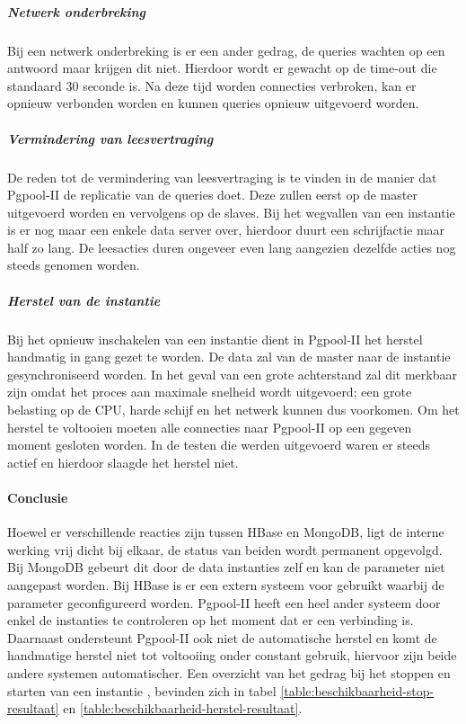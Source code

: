 \subparagraph{Netwerk onderbreking} Bij een netwerk onderbreking is er een ander gedrag, de queries wachten op een antwoord maar krijgen dit niet. Hierdoor wordt er gewacht op de time-out die standaard 30 seconde is. Na deze tijd worden connecties verbroken, kan er opnieuw verbonden worden en kunnen queries opnieuw uitgevoerd worden. 

\subparagraph{Vermindering van leesvertraging} De reden tot de vermindering van leesvertraging is te vinden in de manier dat Pgpool-II de replicatie van de queries doet. Deze zullen eerst op de master uitgevoerd worden en vervolgens op de slaves. Bij het wegvallen van een instantie is er nog maar een enkele data server over, hierdoor duurt een schrijfactie maar half zo lang. De leesacties duren ongeveer even lang aangezien dezelfde acties nog steeds genomen worden. 

\subparagraph{Herstel van de instantie} Bij het opnieuw inschakelen van een instantie dient in Pgpool-II het herstel handmatig in gang gezet te worden. De data zal van de master naar de instantie gesynchroniseerd worden. In het geval van een grote achterstand zal dit merkbaar zijn omdat het proces aan maximale snelheid wordt uitgevoerd; een grote belasting op de CPU, harde schijf en het netwerk kunnen dus voorkomen. Om het herstel te voltooien moeten alle connecties naar Pgpool-II op een gegeven moment gesloten worden. In de testen die werden uitgevoerd waren er steeds actief en hierdoor slaagde het herstel niet. 

\paragraph{Conclusie} Hoewel er verschillende reacties zijn tussen HBase en MongoDB, ligt de interne werking vrij dicht bij elkaar, de status van beiden wordt permanent opgevolgd. Bij MongoDB gebeurt dit door de data instanties zelf en kan de parameter niet aangepast worden. Bij HBase is er een extern systeem voor gebruikt waarbij de parameter geconfigureerd worden. Pgpool-II heeft een heel ander systeem door enkel de instanties te controleren op het moment dat er een verbinding is. 
Daarnaast ondersteunt Pgpool-II ook niet de automatische herstel en komt de handmatige herstel niet tot voltooiing onder constant gebruik, hiervoor zijn beide andere systemen automatischer. Een overzicht van het gedrag bij het stoppen en starten van een instantie , bevinden zich in tabel \ref{table:beschikbaarheid-stop-resultaat} en \ref{table:beschikbaarheid-herstel-resultaat}.

